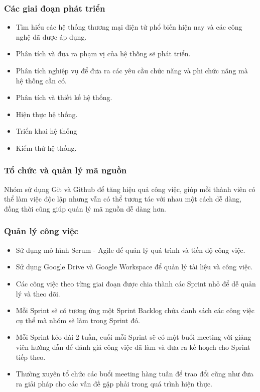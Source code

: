 \subsubsection{Các giai đoạn phát triển}
    \begin{itemize}
        \item Tìm hiểu các hệ thống thương mại điện tử phổ biến hiện nay và các công nghệ đã được áp dụng.
        \item Phân tích và đưa ra phạm vị của hệ thống sẽ phát triển.
        \item Phân tích nghiệp vụ để đưa ra các yêu cầu chức năng và phi chức năng mà hệ thống cần có.
        \item Phân tích và thiết kế hệ thống.
        \item Hiện thực hệ thống.
        \item Triển khai hệ thống
        \item Kiểm thử hệ thống.
    \end{itemize}
\subsubsection{Tổ chức và quản lý mã nguồn}
\noindent Nhóm sử dụng Git và Github để tăng hiệu quả công việc, giúp mỗi thành viên có thể làm việc độc lập nhưng vẫn có thể tương tác với nhau một cách dễ dàng, đồng thời cũng giúp quản lý mã nguồn dễ dàng hơn.
\subsubsection{Quản lý công việc}
\begin{itemize}
    \item Sử dụng mô hình Scrum - Agile để quán lý quá trình và tiến độ công việc.
    \item Sử dụng Google Drive và Google Workspace để quản lý tài liệu và công việc.
    \item Các công việc theo từng giai đoạn được chia thành các Sprint nhỏ để dễ quản lý và theo dõi.
    \item Mỗi Sprint sẽ có tương ứng một Sprint Backlog chứa danh sách các công việc cụ thể mà nhóm sẽ làm trong Sprint đó.
    \item Mỗi Sprint kéo dài 2 tuần, cuối mỗi Sprint sẽ có một buổi meeting với giảng viên hướng dẫn để đánh giá công việc đã làm và đưa ra kế hoạch cho Sprint tiếp theo.
    \item Thường xuyên tổ chức các buổi meeting hàng tuần để trao đổi cũng như đưa ra giải pháp cho các
    vấn đề gặp phải trong quá trình hiện thực. 
\end{itemize}
